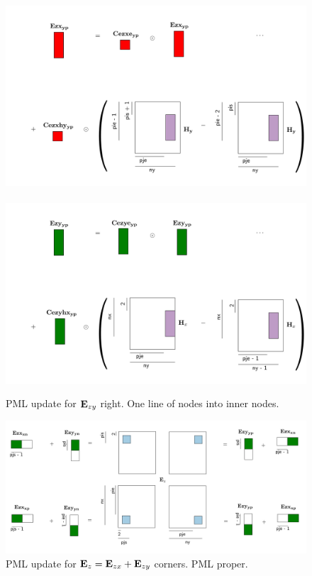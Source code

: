 \documentclass[a4paper,12pt]{article}
\begin{document}
\begin{figure}
\centering
\includegraphics[width=1\textwidth]{../pics/tikz/svg/pml-color/Ezx-yp.pdf}
~
\includegraphics[width=1\textwidth]{../pics/tikz/svg/pml-color/Ezy-yp.pdf}
\caption{PML update for ${\bf E}_{zy}$ right. One line of nodes into inner nodes.}
\end{figure}
%
%
\begin{figure}
\centering
\includegraphics[width=1.4\textwidth,angle=90,origin=c]{../pics/tikz/svg/pml-color/Ex-plus-Ey.pdf}
\caption{PML update for ${\bf E}_z = {\bf E}_{zx} + {\bf E}_{zy}$ corners. PML proper.}
\end{figure}
\end{document}
